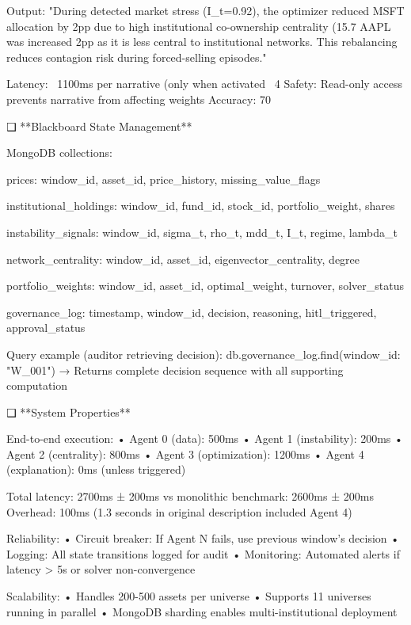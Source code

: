    Output: "During detected market stress (I_t=0.92), the optimizer reduced MSFT 
            allocation by 2pp due to high institutional co-ownership centrality (15.7%
            AAPL was increased 2pp as it is less central to institutional networks. 
            This rebalancing reduces contagion risk during forced-selling episodes."
   
   Latency: ~1100ms per narrative (only when activated ~4%
   Safety: Read-only access prevents narrative from affecting weights
   Accuracy: 70%

❑ **Blackboard State Management**

MongoDB collections:

prices:
   {window_id, asset_id, price_history, missing_value_flags}

institutional_holdings:
   {window_id, fund_id, stock_id, portfolio_weight, shares}

instability_signals:
   {window_id, sigma_t, rho_t, mdd_t, I_t, regime, lambda_t}

network_centrality:
   {window_id, asset_id, eigenvector_centrality, degree}

portfolio_weights:
   {window_id, asset_id, optimal_weight, turnover, solver_status}

governance_log:
   {timestamp, window_id, decision, reasoning, hitl_triggered, approval_status}

Query example (auditor retrieving decision):
   db.governance_log.find({window_id: "W_001"})
   → Returns complete decision sequence with all supporting computation

❑ **System Properties**

End-to-end execution:
   • Agent 0 (data): 500ms
   • Agent 1 (instability): 200ms
   • Agent 2 (centrality): 800ms
   • Agent 3 (optimization): 1200ms
   • Agent 4 (explanation): 0ms (unless triggered)
   
   Total latency: 2700ms ± 200ms
   vs monolithic benchmark: 2600ms ± 200ms
   Overhead: 100ms (1.3 seconds in original description included Agent 4)

Reliability:
   • Circuit breaker: If Agent N fails, use previous window's decision
   • Logging: All state transitions logged for audit
   • Monitoring: Automated alerts if latency > 5s or solver non-convergence

Scalability:
   • Handles 200-500 assets per universe
   • Supports 11 universes running in parallel
   • MongoDB sharding enables multi-institutional deployment